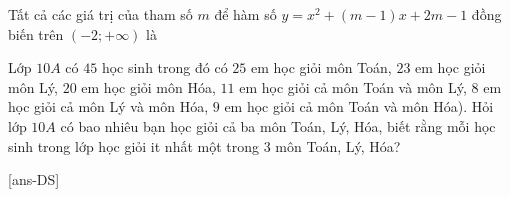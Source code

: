 \begin{ex}%
	Tất cả các giá trị của tham số $m$ để hàm số $y=x^2+(m-1)x+2m-1$ đồng biến trên $(-2;+\infty)$ là 
\end{ex}
\begin{ex}%
	Lớp $10A$ có $45$ học sinh trong đó có $25$ em học giỏi môn Toán, $23$ em học giỏi môn Lý, $20$ em học giỏi môn Hóa, $11$ em học giỏi cả môn Toán và môn Lý, $8$ em học giỏi cả môn Lý và môn Hóa, $9$ em học giỏi cả môn Toán và môn Hóa). Hỏi lớp $10A$ có bao nhiêu bạn học giỏi cả ba môn Toán, Lý, Hóa, biết rằng mỗi học sinh trong lớp học giỏi it nhất một trong $3$ môn Toán, Lý, Hóa?
\end{ex}



\cauds

[ans-DS]


